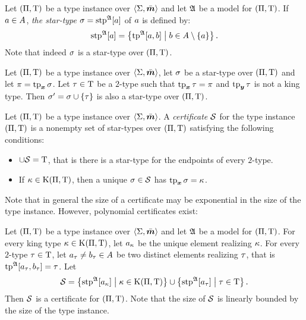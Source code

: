 \begin{definition}\label{def:stp-str}
Let $(\Pi,\mathrm{T})$ be a type instance over $\left\langle \mathrm{\Sigma},\bar{\bm{m}} \right\rangle$
and let $\mathfrak{A}$ be a model for $(\Pi,\mathrm{T})$.
If $a \in A$, \emph{the star-type} $\sigma = \operatorname{stp}^{\mathfrak{A}}[a]$ of $a$ is
defined by:
\[
  \operatorname{stp}^{\mathfrak{A}}[a] = \left\{\operatorname{tp}^{\mathfrak{A}}[a,b]\mathrel{}\middle|\mathrel{}b \in A \setminus \left\{a\right\}\right\}.
\]
Note that indeed $\sigma$ is a star-type over $(\Pi,\mathrm{T})$.
\end{definition}

\begin{remark}\label{rem:star-type-ext}
Let $(\Pi,\mathrm{T})$ be a type instance over $\left\langle \mathrm{\Sigma},\bar{\bm{m}} \right\rangle$,
let $\sigma$ be a star-type over $(\Pi,\mathrm{T})$ and let $\pi = \operatorname{tp}_{\bm{x}}\sigma$.
Let $\tau \in \mathrm{T}$ be a $2$-type such that $\operatorname{tp}_{\bm{x}}\tau = \pi$ and
$\operatorname{tp}_{\bm{y}}\tau$ is not a king type.
Then ${\sigma'} = \sigma \cup \left\{\tau\right\}$ is also a star-type over
$(\Pi,\mathrm{T})$.
\end{remark}

\begin{definition}
Let $(\Pi,\mathrm{T})$ be a type instance over $\left\langle \mathrm{\Sigma},\bar{\bm{m}} \right\rangle$.
A \emph{certificate} $\mathcal{S}$ for the type instance
$(\Pi,\mathrm{T})$ is a nonempty set of star-types over $(\Pi,\mathrm{T})$
satisfying the following conditions:
\begin{itemize}
  \item[\condcertT]\label{cond:certT}
  $\cup\mathcal{S} = \mathrm{T}$, that is there is a star-type for the endpoints of every
  $2$-type.
  \item[\condcertk]\label{cond:certk}
  If $\kappa \in \mathrm{K}(\Pi,\mathrm{T})$, then a unique $\sigma \in \mathcal{S}$ has $\operatorname{tp}_{\bm{x}}\sigma
  = \kappa$.
\end{itemize}
\end{definition}

Note that in general the size of a certificate may be exponential in
the size of the type instance. However, polynomial certificates exist:
\begin{lemma}\label{lem:cert-extract}
Let $(\Pi,\mathrm{T})$ be a type instance over $\left\langle \mathrm{\Sigma},\bar{\bm{m}} \right\rangle$ and let $\mathfrak{A}$
be a model for $(\Pi,\mathrm{T})$.
For every king type $\kappa \in \mathrm{K}(\Pi,\mathrm{T})$, let $a_{\kappa}$ be the unique
element realizing $\kappa$.
For every $2$-type $\tau \in \mathrm{T}$, let $a_{\tau} \neq b_{\tau} \in A$
be two distinct elements realizing $\tau$, that is
$\operatorname{tp}^{\mathfrak{A}}[a_{\tau},b_{\tau}] = \tau$.
Let
\[
  \mathcal{S} = \left\{\operatorname{stp}^{\mathfrak{A}}[a_{\kappa}]\mathrel{}\middle|\mathrel{}\kappa \in \mathrm{K}(\Pi,\mathrm{T})\right\}
  \cup \left\{\operatorname{stp}^{\mathfrak{A}}[a_{\tau}]\mathrel{}\middle|\mathrel{}\tau\in\mathrm{T}\right\}.
\]
Then $\mathcal{S}$ is a certificate for $(\Pi,\mathrm{T})$.
Note that the size of $\mathcal{S}$ is linearly bounded by the size of the type
instance.
\end{lemma}

